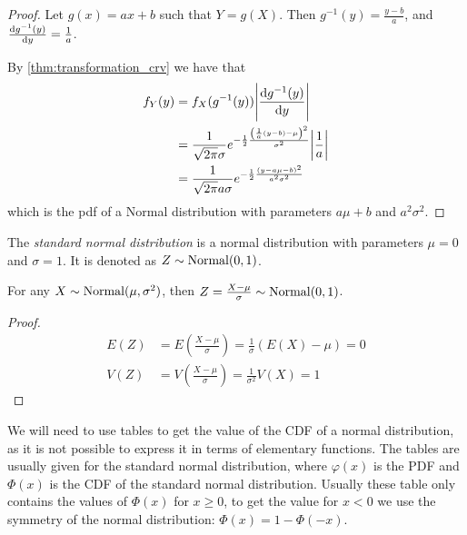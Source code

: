 \documentclass[12pt]{extarticle}
\begin{document}
\begin{proof}
    Let $g(x) = ax + b$ such that $Y = g(X)$.
    Then $g^{-1}(y) = \frac{y - b}{a}$, and $\dv{g^{-1}(y)}{y} = \frac{1}{a}$.

    By \ref{thm:transformation_crv} we have that
    \begin{align}
        f_Y(y) & = f_X(g^{-1}(y)) \abs{\dv{g^{-1}(y)}{y}}                                                                                \\
               & = \frac{1}{\sqrt{2\pi} \sigma} e^{-\frac{1}{2} \frac{\left(\frac{1}{a}(y-b)- \mu\right)^2}{\sigma^2}} \abs{\frac{1}{a}} \\
               & = \frac{1}{\sqrt{2\pi} a \sigma} e^{-\frac{1}{2} \frac{(y - a\mu - b)^2}{a^2 \sigma^2}}
    \end{align}
    which is the pdf of a Normal distribution with parameters $a\mu + b$ and $a^2 \sigma^2$.
\end{proof}

\begin{definition}
    The \emph{standard normal distribution} is a normal distribution with parameters $\mu = 0$ and $\sigma = 1$. It is denoted as $Z \sim \operatorfont{Normal}(0, 1)$.
\end{definition}

\begin{lemma}
    For any $X \sim \operatorfont{Normal}(\mu, \sigma^2)$, then $Z = \frac{X - \mu}{\sigma} \sim \operatorfont{Normal}(0, 1)$.
\end{lemma}

\begin{proof}
    \begin{align}
        E(Z) & = E\left(\frac{X - \mu}{\sigma}\right) = \frac{1}{\sigma} (E(X) - \mu) = 0 \\
        V(Z) & = V\left(\frac{X - \mu}{\sigma}\right) = \frac{1}{\sigma^2} V(X) = 1
    \end{align}
\end{proof}

\begin{remark}
    We will need to use tables to get the value of the CDF of a normal distribution, as it is not possible to express it in terms of elementary functions.
    The tables are usually given for the standard normal distribution, where $\varphi(x)$ is the PDF and $\Phi(x)$ is the CDF of the standard normal distribution.
    Usually these table only contains the values of $\Phi(x)$ for $x \geq 0$, to get the value for $x < 0$ we use the symmetry of the normal distribution: $\Phi(x) = 1 - \Phi(-x)$.
\end{remark}
\end{document}
